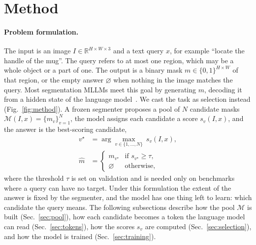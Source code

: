 \section{Method}
\label{sec:method}

\paragraph{Problem formulation.}
The input is an image $I\in\mathbb{R}^{H\times W\times 3}$ and a text query $x$, for example ``locate the handle of
the mug''. The query refers to at most one region, which may be a whole object or a part of one. The output is a
binary mask $m\in\{0,1\}^{H\times W}$ of that region, or the empty answer $\varnothing$ when nothing in the image
matches the query. Most segmentation MLLMs meet this goal by generating $m$, decoding it from a hidden state of the
language model~\cite{lisa,sa2va}. We cast the task as selection instead (Fig.~\ref{fig:method}). A frozen segmenter proposes a pool
of $N$ candidate masks $\mathcal{M}(I,x)=\{m_v\}_{v=1}^{N}$, the model assigns each candidate a score $s_v(I,x)$, and
the answer is the best-scoring candidate,
\begin{equation}
\begin{aligned}
  v^{\star}&=\arg\max_{v\in\{1,\dots,N\}}\ s_v(I,x), \\
  \hat{m}&=\begin{cases} m_{v^{\star}} & \text{if } s_{v^{\star}}\geq\tau,\\ \varnothing & \text{otherwise,}\end{cases}
\end{aligned}
  \label{eq:selection}
\end{equation}
where the threshold $\tau$ is set on validation and is needed only on benchmarks where a query can have no target.
Under this formulation the extent of the answer is fixed by the segmenter, and the model has one thing left to
learn: which candidate the query means. The following subsections describe how the pool $\mathcal{M}$ is built
(Sec.~\ref{sec:pool}), how each candidate becomes a token the language model can read (Sec.~\ref{sec:tokens}), how
the scores $s_v$ are computed (Sec.~\ref{sec:selection}), and how the model is trained (Sec.~\ref{sec:training}).

